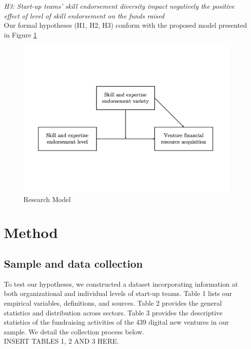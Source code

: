 \documentclass[12pt]{article}
\begin{document}
\noindent \textit{H3: Start-up teams' skill endorsement diversity impact negatively the positive effect of level of skill endorsement on the funds raised} \\

Our formal hypotheses (H1, H2, H3) conform with the proposed model presented in Figure \ref{Figure1}

\begin{figure}[!b]
  \includegraphics[width=\linewidth, scale=0.5]{model.pdf}
  \caption{Research Model}
  \label{Figure1}
\end{figure}

\section{Method}

\subsection{Sample and data collection}

To test our hypotheses, we constructed a dataset incorporating information at both organizational and individual levels of start-up teams. Table 1\label{table1} lists our empirical variables, definitions, and sources. Table 2\label{table2} provides the general statistics and distribution across sectors. Table 3\label{table3} provides the descriptive statistics of the fundraising activities of the 439 digital new ventures in our sample. We detail the collection process below. \\

INSERT TABLES 1, 2 AND 3 HERE. \\
\end{document}
